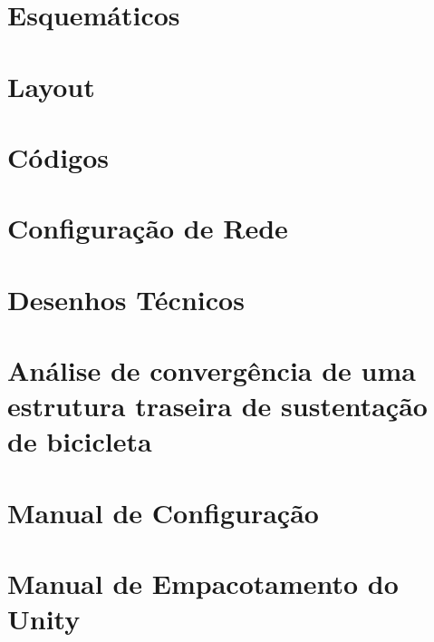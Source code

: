 \begin{apendicesenv}
\chapter{Esquemáticos}


\chapter{Layout}


\chapter{Códigos}

\chapter{Configuração de Rede}



\chapter{Desenhos Técnicos}


\chapter{Análise de convergência de uma estrutura traseira de sustentação de bicicleta}


\chapter{Manual de Configuração}


\chapter{Manual de Empacotamento do Unity}

  
\end{apendicesenv}
